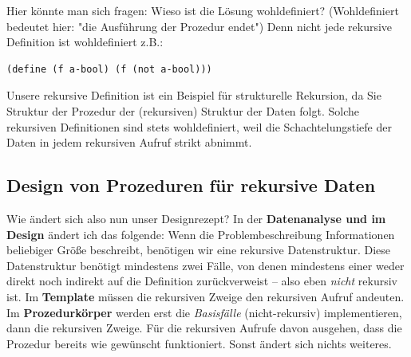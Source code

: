 Hier könnte man sich fragen: Wieso ist die Lösung wohldefiniert? (Wohldefiniert bedeutet hier: "die Ausführung der Prozedur endet") Denn nicht jede rekursive Definition ist wohldefiniert z.B.:
\begin{lstlisting}
(define (f a-bool) (f (not a-bool)))
\end{lstlisting}
Unsere rekursive Definition ist ein Beispiel für strukturelle
Rekursion, da Sie Struktur der Prozedur der (rekursiven) Struktur der Daten folgt. Solche rekursiven Definitionen sind stets wohldefiniert, weil die Schachtelungstiefe der Daten in jedem rekursiven Aufruf strikt abnimmt.

\subsection{Design von Prozeduren für rekursive Daten}
Wie ändert sich also nun unser Designrezept? In der \textbf{Datenanalyse und im Design} ändert ich das folgende: Wenn die Problembeschreibung Informationen beliebiger Größe beschreibt, benötigen wir eine rekursive Datenstruktur. Diese Datenstruktur benötigt mindestens zwei Fälle, von denen mindestens einer weder direkt noch indirekt auf die Definition zurückverweist – also eben \textit{nicht} rekursiv ist. Im \textbf{Template} müssen die rekursiven Zweige den rekursiven Aufruf andeuten. Im \textbf{Prozedurkörper} werden erst die \textit{Basisfälle} (nicht-rekursiv) implementieren, dann die rekursiven Zweige. Für die rekursiven Aufrufe davon ausgehen, dass die Prozedur bereits wie gewünscht funktioniert. Sonst ändert sich nichts weiteres.

